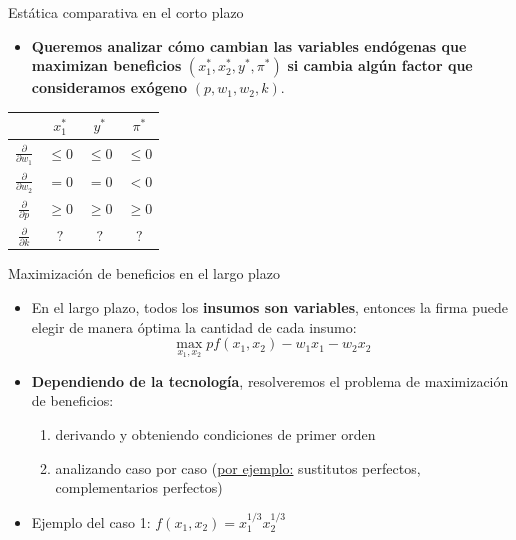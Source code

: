 \documentclass{beamer}
\theoremstyle{definition}
\begin{document}
\begin{frame}{Est\'atica comparativa en el corto plazo}
	\begin{itemize}
	\item \textbf{Queremos analizar c\'{o}mo cambian las variables endógenas que maximizan beneficios} $(x_1^*,x_2^*,y^*,\pi^*)$ \textbf{si cambia alg\'{u}n factor que consideramos ex\'{o}geno} $(p,w_1,w_2,k)$. 
	\end{itemize}
\begin{center}
\begin{tabular}{|c|c|c|c|}
\hline
&$x_1^*$ & $y^*$ & $\pi^*$\\[6pt] 
\hline 
$\frac{\partial}{\partial w_1}$ &\color{rosee} $\leq 0$ & \color{rosee}$\leq 0$&\color{cyan}$\leq 0$\\[6pt]
\hline
$\frac{\partial}{\partial w_2}$ &\color{gray}$= 0$&\color{gray}$= 0$&\color{cyan} $<0$\\[6pt]
\hline
$\frac{\partial}{\partial p}$&\color{rosee}$\geq 0$&\color{rosee}$\geq 0$&\color{cyan}$\geq 0$\\[6pt]
\hline
$\frac{\partial}{\partial k}$&\color{rosee} $?$&\color{rosee}$?$ &\color{gray} $?$ \\[6pt]
\hline
\end{tabular}
\end{center}
\end{frame}	



\begin{frame}{Maximización de beneficios en el largo plazo}	
 \begin{itemize}
 	\item En el largo plazo, todos los \textbf{insumos son variables}, entonces la firma puede elegir de manera \'optima la cantidad de cada insumo:
 	\begin{equation*}
 	\max_{x_{1},x_{2}}pf(x_{1},x_{2})-w_{1}x_{1}-w_{2}x_{2}
 	\end{equation*}
 	
	\item \textbf{Dependiendo de la tecnología}, resolveremos el problema de maximización de beneficios:
	\begin{enumerate}
	    \item derivando y obteniendo condiciones de primer orden
	    \item analizando caso por caso (\underline{por ejemplo:} sustitutos perfectos, complementarios perfectos)
	\end{enumerate}
 \item Ejemplo del caso 1: $f(x_1,x_2)=x_1^{1/3}x_2^{1/3}$
	 \end{itemize}
	 \end{frame}
 
\end{document}
